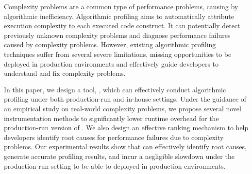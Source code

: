 Complexity problems are a common type of performance problems, 
causing by algorithmic inefficiency. 
Algorithmic profiling aims to automatically attribute execution 
complexity to each executed code construct.
It can potentially detect previously unknown complexity problems 
and diagnose performance failures caused by complexity problems. 
However, existing algorithmic profiling techniques 
suffer from several severe limitations, 
missing opportunities to be deployed in production environments 
and effectively guide developers 
to understand and fix complexity problems. 

In this paper, we design a tool, \Tool, which can effectively conduct 
algorithmic profiling under both production-run and in-house settings.
Under the guidance of an empirical study on real-world complexity problems, 
we propose several novel instrumentation methods to 
significantly lower runtime overhead
for the production-run version of \Tool.
We also design an effective ranking mechanism to help developers identify 
root causes for performance failures due to complexity problems. 
Our experimental results show that \Tool 
can effectively identify root causes, 
generate accurate profiling results, 
and incur a negligible slowdown under the production-run setting
to be able to deployed in production environments. 





